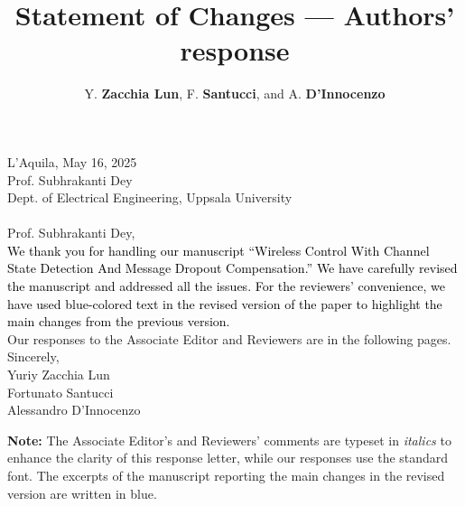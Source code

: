 \documentclass{article}
\title{\textbf{Statement of Changes --- Authors' response}}
\author{Y. \textbf{Zacchia Lun}, F. \textbf{Santucci}, and A. \textbf{D'Innocenzo}}
\date{\vspace{-5ex}}
\renewcommand{\!}{\tmspace-\thinmuskip{.1667em}}
\begin{document}
\thispagestyle{empty}
\hspace*{\fill} L'Aquila, {May 16, 2025}\\[1cm]
Prof. Subhrakanti Dey\\
Dept. of Electrical Engineering, Uppsala University\\\\
\noindent
Prof. Subhrakanti Dey,\\[2mm]
\indent \textcolor{black}{We thank you for handling our manuscript ``Wireless Control With Channel State Detection And Message Dropout Compensation.''
\textcolor{black}{We have carefully revised the manuscript and addressed all the issues.} For the reviewers' convenience, we have used blue-colored text in the revised version of the paper to highlight the main changes from the previous version.}\\[2mm]
\indent Our responses to the Associate Editor and Reviewers are in the following pages.\\[4mm]
\noindent
Sincerely,\\[4mm]
\noindent
Yuriy Zacchia Lun\\
Fortunato Santucci\\
Alessandro D'Innocenzo\\

\clearpage
{}
\maketitle
\tableofcontents
\vspace{2cm}
\noindent \textbf{Note:} The Associate Editor's and Reviewers' comments are typeset in \textit{italics} to enhance the clarity of this response letter, while our responses use the standard font. The excerpts of the manuscript reporting the main changes in the revised version are written in blue.





\end{document}
